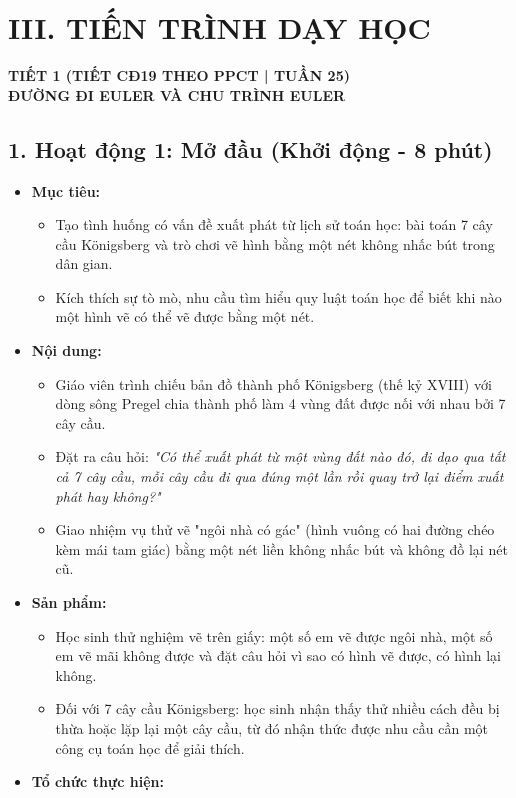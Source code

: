 \documentclass[12pt, a4paper]{article}
\begin{document}
\section*{III. TIẾN TRÌNH DẠY HỌC}

\begin{center}
    \textbf{\large TIẾT 1 (TIẾT CĐ19 THEO PPCT | TUẦN 25)}\\[4pt]
    \textbf{\large ĐƯỜNG ĐI EULER VÀ CHU TRÌNH EULER}
\end{center}

\subsection*{1. Hoạt động 1: Mở đầu (Khởi động - 8 phút)}

\begin{itemize}[leftmargin=1.2cm]
    \item[a)] \textbf{Mục tiêu:}
    \begin{itemize}[leftmargin=0.6cm]
        \item Tạo tình huống có vấn đề xuất phát từ lịch sử toán học: bài toán 7 cây cầu Königsberg và trò chơi vẽ hình bằng một nét không nhấc bút trong dân gian.
        \item Kích thích sự tò mò, nhu cầu tìm hiểu quy luật toán học để biết khi nào một hình vẽ có thể vẽ được bằng một nét.
    \end{itemize}

    \item[b)] \textbf{Nội dung:}
    \begin{itemize}[leftmargin=0.6cm]
        \item Giáo viên trình chiếu bản đồ thành phố Königsberg (thế kỷ XVIII) với dòng sông Pregel chia thành phố làm 4 vùng đất được nối với nhau bởi 7 cây cầu.
        \item Đặt ra câu hỏi: \textit{"Có thể xuất phát từ một vùng đất nào đó, đi dạo qua tất cả 7 cây cầu, mỗi cây cầu đi qua đúng một lần rồi quay trở lại điểm xuất phát hay không?"}
        \item Giao nhiệm vụ thử vẽ "ngôi nhà có gác" (hình vuông có hai đường chéo kèm mái tam giác) bằng một nét liền không nhấc bút và không đồ lại nét cũ.
    \end{itemize}

    \item[c)] \textbf{Sản phẩm:}
    \begin{itemize}[leftmargin=0.6cm]
        \item Học sinh thử nghiệm vẽ trên giấy: một số em vẽ được ngôi nhà, một số em vẽ mãi không được và đặt câu hỏi vì sao có hình vẽ được, có hình lại không.
        \item Đối với 7 cây cầu Königsberg: học sinh nhận thấy thử nhiều cách đều bị thừa hoặc lặp lại một cây cầu, từ đó nhận thức được nhu cầu cần một công cụ toán học để giải thích.
    \end{itemize}

    \item[d)] \textbf{Tổ chức thực hiện:}
\end{itemize}
\end{document}

